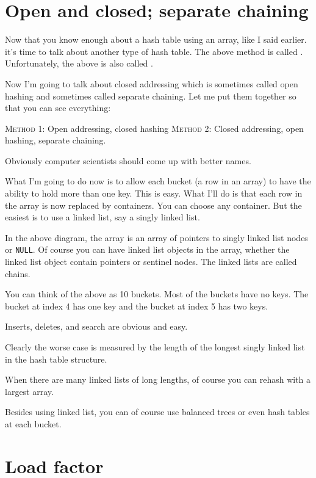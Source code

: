 \newpage
\section{Open and closed; separate chaining}

Now that you know enough about a hash table using an array,
like I said earlier. it's time to talk about another type of hash table.
The above method is called .
Unfortunately, the above is also called .

Now I'm going to talk about closed addressing which is sometimes called
open hashing and sometimes called separate chaining.
Let me put them together so that you can see everything:
\begin{tightlist}
\li \textsc{Method 1}: Open addressing, closed hashing
\li \textsc{Method 2}: Closed addressing, open hashing, separate chaining.
\end{tightlist}
Obviously computer scientists should come up with better
names.

What I'm going to do now is to allow each bucket
(a row in an array) to have the ability to hold more than one key.
This is easy.
What I'll do is that each row in the array is now replaced by 
containers.
You can choose any container.
But the easiest is to use a linked list, say a singly linked list.


In the above diagram, the array is an array of pointers to singly linked list nodes
or \verb!NULL!.
Of course you can have linked list objects in the array, 
whether the linked list object contain pointers or sentinel nodes.
The linked lists are called chains.

You can think of the above as 10 buckets.
Most of the buckets have no keys.
The bucket at index 4 has one key
and the bucket at index 5 has two keys.

Inserts, deletes, and search are obvious and easy.

Clearly the worse case is measured by the length of the longest singly
linked list in the hash table structure.

When there are many linked lists of long lengths,
of course you can rehash with a largest array.

Besides using linked list, you can of course use balanced trees or even
hash tables at each bucket.



\newpage
\section{Load factor}

